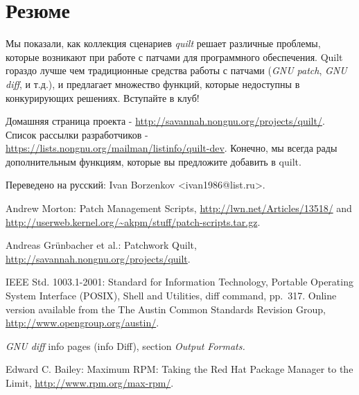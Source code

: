 \documentclass{article}
\newcommand{\prog}[1]{\textit{#1}}
\begin{document}


\section{Резюме}

Мы показали, как коллекция сценариев \textit{quilt} решает различные проблемы, которые возникают при работе с патчами для программного обеспечения. Quilt гораздо лучше чем традиционные средства работы с патчами (\prog{GNU patch}, \prog{GNU diff}, и т.д.), и предлагает множество функций, которые недоступны в конкурирующих решениях. Вступайте в клуб!

Домашняя страница проекта - \url{http://savannah.nongnu.org/projects/quilt/}. Список рассылки разработчиков - \url{https://lists.nongnu.org/mailman/listinfo/quilt-dev}.
Конечно, мы всегда рады дополнительным функциям, которые вы предложите добавить в quilt.

Переведено на русский: Ivan Borzenkov <ivan1986@list.ru>.

\begin{thebibliography}{XX}

Andrew Morton: Patch Management Scripts,
\url{http://lwn.net/Articles/13518/} and
\url{http://userweb.kernel.org/~akpm/stuff/patch-scripts.tar.gz}.

Andreas Grünbacher et al.: Patchwork Quilt,
\url{http://savannah.nongnu.org/projects/quilt}.

IEEE Std. 1003.1-2001: Standard for Information Technology, Portable
Operating System Interface (POSIX), Shell and Utilities, diff
command, pp.~317. Online version available from the The Austin Common
Standards Revision Group, \url{http://www.opengroup.org/austin/}.

\textit{GNU diff} info pages (\textsf{info Diff}), section \textit{Output
Formats.}

Edward C. Bailey: Maximum RPM: Taking the Red Hat Package Manager to the
Limit, \url{http://www.rpm.org/max-rpm/}.

\end{thebibliography}

\end{document}
